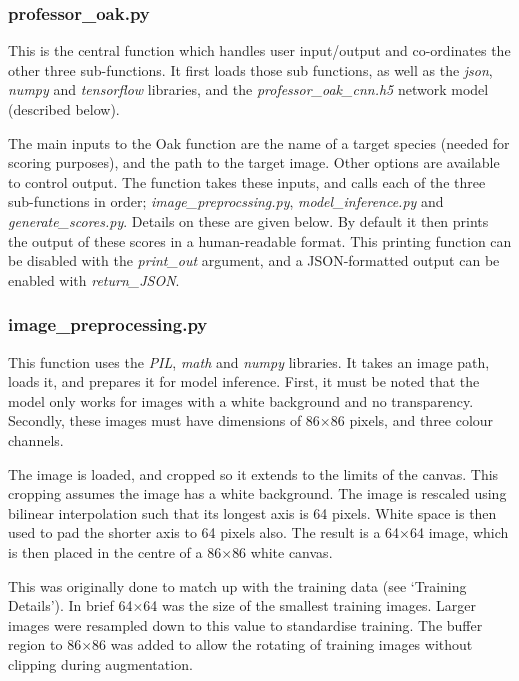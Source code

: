 \documentclass[onecolumn]{article}
\begin{document}
\subsubsection*{professor\_oak.py}


This is the central function which handles user input/output and co-ordinates the other three sub-functions. It first loads those sub functions, as well as the \textit{json}, \textit{numpy} and \textit{tensorflow} libraries, and the \textit{professor\_oak\_cnn.h5} network model (described below).

The main inputs to the Oak function are the name of a target species (needed for scoring purposes), and the path to the target image. Other options are available to control output. The function takes these inputs, and calls each of the three sub-functions in order; \textit{image\_preprocssing.py}, \textit{model\_inference.py} and \textit{generate\_scores.py}. Details on these are given below. By default it then prints the output of these scores in a human-readable format. This printing function can be disabled with the \textit{print\_out} argument, and a JSON-formatted output can be enabled with \textit{return\_JSON}.

\subsubsection*{image\_preprocessing.py}

This function uses the \textit{PIL}, \textit{math} and \textit{numpy} libraries. It takes an image path, loads it, and prepares it for model inference. First, it must be noted that the model only works for images with a white background and no transparency. Secondly, these images must have dimensions of 86$\times$86 pixels, and three colour channels. 

The image is loaded, and cropped so it extends to the limits of the canvas. This cropping assumes the image has a white background. The image is rescaled using bilinear interpolation such that its longest axis is 64 pixels. White space is then used to pad the shorter axis to 64 pixels also. The result is a 64$\times$64 image, which is then placed in the centre of a 86$\times$86 white canvas.

This was originally done to match up with the training data (see `Training Details'). In brief 64$\times$64 was the size of the smallest training images. Larger images were resampled down to this value to standardise training. The buffer region to 86$\times$86 was added to allow the rotating of training images without clipping during augmentation. 
\end{document}
